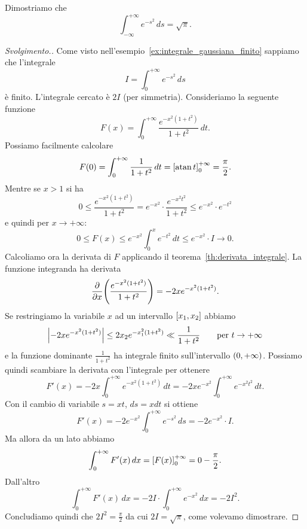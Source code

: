 \begin{exercise}
  \label{ex:integrale_gaussiana}%
Dimostriamo che 
\[
  \int_{-\infty}^{+\infty} e^{-s^2}\, ds = \sqrt \pi.
\]
\end{exercise}
%
\begin{proof}[Svolgimento.]
Come visto nell'esempio~\ref{ex:integrale_gaussiana_finito}
sappiamo che l'integrale
\[
  I = \int_{0}^{+\infty} e^{-s^2}\, ds
\]
è finito. 
L'integrale cercato è $2I$ (per simmetria).
Consideriamo la seguente funzione
\[ 
  F(x) = \int_0^{+\infty} \frac{e^{-x^2(1+t^2)}}{1+t^2}\, dt.
\]
Possiamo facilmente calcolare 
\[
  F(0) = \int_0^{+\infty} \frac{1}{1+t^2}\, dt = {\left[ \operatorname{atan} t \right]}_0^{+\infty} = \frac \pi 2.
\]
Mentre se $x>1$ si ha 
\[
  0\le \frac{e^{-x^2(1+t^2)}}{1+t^2}
  = e^{-x^2}\cdot \frac{e^{-x^2t^2}}{1+t^2}
  \le e^{-x^2}\cdot e^{-t^2}
\]
e quindi per $x\to +\infty$:
\[
  0\le F(x) \le e^{-x^2} \int_0^x e^{-t^2}\, dt \le e^{-x^2}\cdot I \to 0.
\]
Calcoliamo ora la derivata di $F$ applicando il teorema~\ref{th:derivata_integrale}.
La funzione integranda ha derivata 
\[
 \frac{\partial}{\partial x}{\left( \frac{e^{-x^2(1+t^2)}}{1+t^2} \right)}
 = -2x e^{-x^2(1+t^2)}.
\]
Se restringiamo la variabile $x$ ad un intervallo $\left[x_1,x_2\right]$
abbiamo 
\[
 {\left|-2x e^{-x^2(1+t^2)}\right|}
 \le 2 x_2 e^{-x_1^2(1+t^2)} \ll \frac{1}{1+t^2}
 \qquad\text{per } t\to+\infty
\]
e la funzione dominante $\frac{1}{1+t^2}$ ha integrale finito sull'intervallo 
$\left(0,+\infty\right)$. 
Possiamo quindi scambiare la derivata con l'integrale per ottenere 
\[
 F'(x) = - 2 x\int_0^{+\infty} e^{-x^2(1+t^2)}\, dt
       = - 2 x e^{-x^2}\int_0^{+\infty} e^{-x^2t^2}\, dt. 
\]
Con il cambio di variabile $s=xt$, $ds=x dt$ si ottiene
\[
 F'(x) = -2 e^{-x^2}\int_0^{+\infty} e^{-s^2}\, ds = - 2 e^{-x^2}\cdot I.
\]
Ma allora da un lato abbiamo 
\[
  \int_0^{+\infty} F'(x)\, dx 
  = {\left[ F(x) \right]}_0^{+\infty}  = 0 - \frac{\pi}{2}.
\]
Dall'altro 
\[
 \int_0^{+\infty} F'(x)\, dx 
 = - 2 I \cdot \int_0^{+\infty} e^{-x^2}\, dx
 = - 2 I^2. 
\]
Concludiamo quindi che $2I^2 = \frac \pi 2$ da cui 
$2I=\sqrt \pi$, come volevamo dimostrare.
\end{proof}

